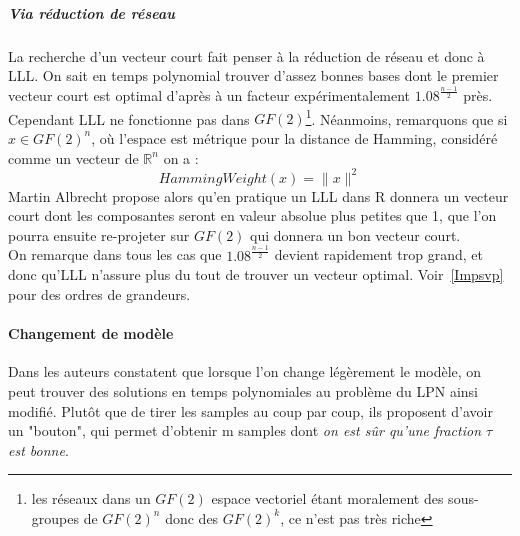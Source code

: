 \documentclass{article}		%
\theoremstyle{definition}
\theoremstyle{plain}
\theoremstyle{plain}
\theoremstyle{plain}
\theoremstyle{plain}
\theoremstyle{plain}
\begin{document}
\subparagraph{Via réduction de réseau} 
La recherche d'un vecteur court fait penser à la réduction de réseau et
donc à LLL. On sait en temps polynomial trouver d'assez bonnes bases dont
le premier vecteur court est optimal d'après \cite{Phong} à un facteur expérimentalement
$1.08^{\frac {n-1} 2}$ près.
Cependant LLL ne fonctionne pas dans $GF(2)$\footnote{les réseaux dans un
$GF(2)$ espace vectoriel étant moralement des sous-groupes de $GF(2)^n$
donc des $GF(2)^k$, ce n'est pas très riche}. Néanmoins, remarquons que
si 
 $x\in GF(2)^n$, où l'espace est métrique pour la distance de Hamming, considéré comme un vecteur de $\mathbb{R}^n$ on a :
$$HammingWeight(x)=\| x \| ^2$$  
 Martin Albrecht propose alors qu'en pratique un LLL dans R donnera un
vecteur court dont les composantes seront en valeur absolue plus petites
que 1, que l'on pourra ensuite re-projeter sur $GF(2)$ qui donnera un bon
vecteur court.
\\
On remarque dans tous les cas que $1.08^{\frac {n-1} {2}}$ devient
rapidement trop grand, et donc qu'LLL n'assure plus du tout de trouver un
vecteur optimal. Voir~\ref{Impsvp} pour des ordres de grandeurs.

\paragraph{Changement de modèle}

 Dans \cite{Arora} les auteurs constatent
que lorsque l'on change légèrement le modèle, on peut trouver des
solutions en temps polynomiales au problème du LPN ainsi modifié. Plutôt que de tirer les samples au coup par coup,
ils proposent d'avoir un "bouton", qui permet d'obtenir m samples dont
\emph{on
est sûr qu'une fraction $\tau$ est bonne}.
\end{document}
